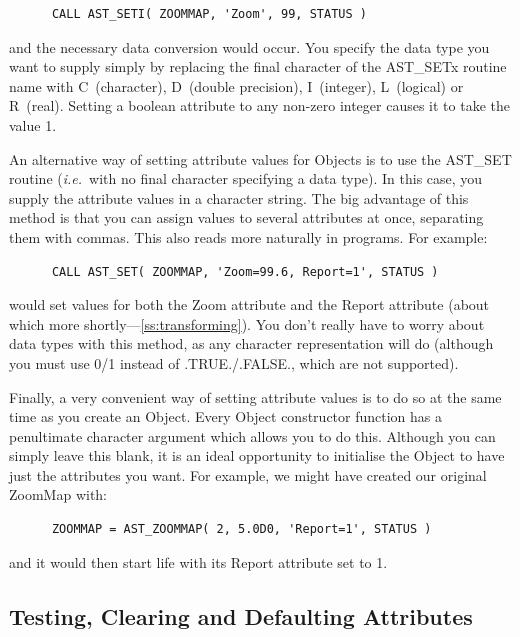 \documentclass[twoside,11pt]{article}
\newcommand{\htmlref}[2]{#1}
\newcommand{\secref}[1]{\S\ref{#1}}
\renewcommand{\secref}[1]{\ref{#1}}
\begin{document}
\small
\begin{verbatim}
      CALL AST_SETI( ZOOMMAP, 'Zoom', 99, STATUS )
\end{verbatim}
\normalsize

and the necessary data conversion would occur.  You specify the data
type you want to supply simply by replacing the final character of the
AST\_SETx routine name with C~(character), D~(double precision),
I~(integer), L~(logical) or R~(real).  Setting a boolean attribute to
any non-zero integer causes it to take the value 1.

An alternative way of setting attribute values for Objects is to use
the \htmlref{AST\_SET}{AST_SET} routine ({\em{i.e.}}\ with no final character specifying
a data type). In this case, you supply the attribute values in a
character string. The big advantage of this method is that you can
assign values to several attributes at once, separating them with
commas. This also reads more naturally in programs. For example:

\small
\begin{verbatim}
      CALL AST_SET( ZOOMMAP, 'Zoom=99.6, Report=1', STATUS )
\end{verbatim}
\normalsize

would set values for both the Zoom attribute and the \htmlref{Report}{Report} attribute
(about which more shortly---\secref{ss:transforming}). You don't really
have to worry about data types with this method, as any character
representation will do (although you must use 0/1 instead of
.TRUE./.FALSE., which are not supported).

\label{ss:attributeinitialisation}

Finally, a very convenient way of setting attribute values is to do so
at the same time as you create an Object. Every Object constructor
function has a penultimate character argument which allows you to do
this. Although you can simply leave this blank, it is an ideal
opportunity to initialise the Object to have just the attributes you
want. For example, we might have created our original ZoomMap with:

\small
\begin{verbatim}
      ZOOMMAP = AST_ZOOMMAP( 2, 5.0D0, 'Report=1', STATUS )
\end{verbatim}
\normalsize

and it would then start life with its Report attribute set to 1.

\subsection{\label{ss:defaultingattributes}Testing, Clearing and Defaulting Attributes}
\end{document}
